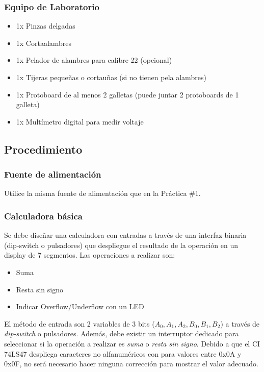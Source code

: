 \subsubsection*{Equipo de Laboratorio}
\begin{itemize}
    \item 1x Pinzas delgadas
    \item 1x Cortaalambres
    \item 1x Pelador de alambres para calibre 22 (opcional)
    \item 1x Tijeras pequeñas o cortauñas (si no tienen pela alambres)
    \item 1x Protoboard de al menos 2 galletas (puede juntar 2 protoboards de 1 galleta)
    \item 1x Multímetro digital para medir voltaje
\end{itemize}

\subsection{Procedimiento}
\subsubsection{Fuente de alimentación}
Utilice la misma fuente de alimentación que en la Práctica \#1.

\subsubsection{Calculadora básica}
Se debe diseñar una calculadora con entradas a través de una interfaz binaria (dip-switch o pulsadores) que despliegue el resultado de la
operación en un display de 7 segmentos. Las operaciones a realizar son:
\begin{itemize}
    \item Suma 
    \item Resta sin signo
    \item Indicar Overflow/Underflow con un LED
\end{itemize}

\vspace{14pt}

El método de entrada son 2 variables de 3 bits ($A_0, A_1, A_2, B_0, B_1, B_2$) a través de \emph{dip-switch} o pulsadores. Además, debe existir
un interruptor dedicado para seleccionar si la operación a realizar es \emph{suma} o \emph{resta sin signo}.
Debido a que el CI 74LS47 despliega caracteres no alfanuméricos con para valores entre 0x0A y 0x0F, no será necesario hacer ninguna corrección para
mostrar el valor adecuado.






